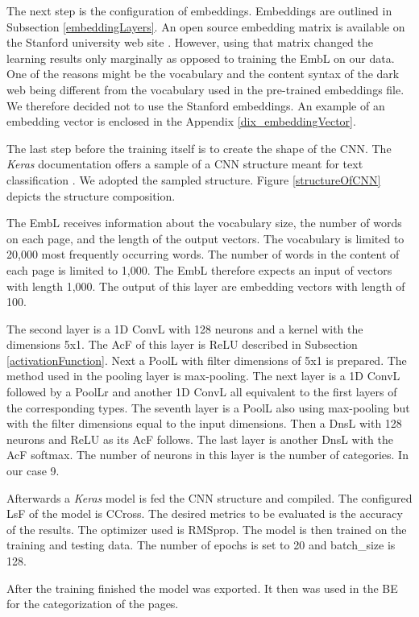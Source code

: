 The next step is the configuration of embeddings. Embeddings are outlined in Subsection \ref{embeddingLayers}. An open source embedding matrix is available on the Stanford university web site \cite{embeddings}. However, using that matrix changed the learning results only marginally as opposed to training the EmbL on our data. One of the reasons might be the vocabulary and the content syntax of the dark web being different from the vocabulary used in the pre-trained embeddings file. We therefore decided not to use the Stanford embeddings. An example of an embedding vector is enclosed in the Appendix \ref{dix_embeddingVector}.

The last step before the training itself is to create the shape of the CNN. The \textit{Keras} documentation offers a sample of a CNN structure meant for text classification \cite{kerasCNNStructure}. We adopted the sampled structure. Figure \ref{structureOfCNN} depicts the structure composition. 

The EmbL receives information about the vocabulary size, the number of words on each page, and the length of the output vectors. The vocabulary is limited to 20,000 most frequently occurring words. The number of words in the content of each page is limited to 1,000. The EmbL therefore expects an input of vectors with length 1,000. The output of this layer are embedding vectors with length of 100. 

The second layer is a 1D ConvL with 128 neurons and a kernel with the dimensions 5x1. The AcF of this layer is ReLU described in Subsection \ref{activationFunction}. Next a PoolL with filter dimensions of 5x1 is prepared. The method used in the pooling layer is max-pooling. The next layer is a 1D ConvL followed by a PoolLr and another 1D ConvL all equivalent to the first layers of the corresponding types. The seventh layer is a PoolL also using max-pooling but with the filter dimensions equal to the input dimensions. Then a DnsL with 128 neurons and ReLU as its AcF follows. The last layer is another DnsL with the AcF softmax. The number of neurons in this layer is the number of categories. In our case 9.

Afterwards a \textit{Keras} model is fed the CNN structure and compiled. The configured LsF of the model is CCross. The desired metrics to be evaluated is the accuracy of the results. The optimizer used is RMSprop. The model is then trained on the training and testing data. The number of epochs is set to 20 and batch\_size is 128.

After the training finished the model was exported. It then was used in the BE for the categorization of the pages.




